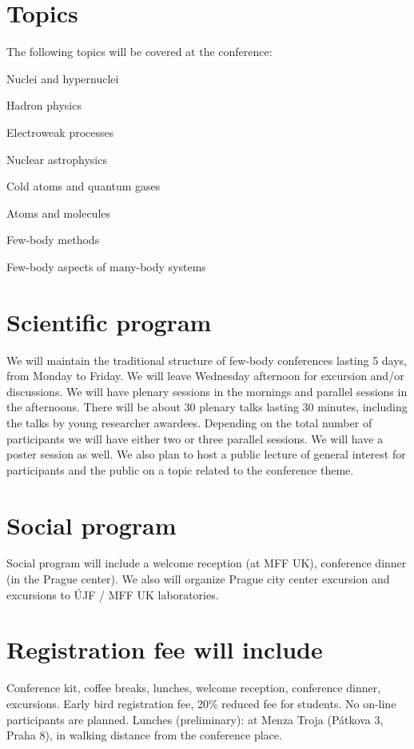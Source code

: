 \documentclass[12pt]{extarticle}
\newcommand*\sq{\mathbin{\vcenter{\hbox{\rule{.8ex}{.8ex}}}}}
\newenvironment{t_sq_itemize}
{\begin{itemize}[topsep=0pt, parsep=0pt, itemsep=0pt, leftmargin=*]
    \renewcommand{\labelitemi}{{\(\sq\)}}}
  {\end{itemize}}
\begin{document}
\section*{Topics}
\noindent
The following topics will be covered at the conference:
\begin{t_sq_itemize}
\item Nuclei and hypernuclei
\item Hadron physics
\item Electroweak processes
\item Nuclear astrophysics
\item Cold atoms and quantum gases
\item Atoms and molecules
\item Few-body methods
\item Few-body aspects of many-body systems
\end{t_sq_itemize}

\section*{Scientific program}
\noindent
We will maintain the traditional structure of few-body conferences lasting 5 days, from Monday
to Friday. We will leave Wednesday afternoon for excursion and/or discussions. We will have plenary sessions
in the mornings and parallel sessions in the afternoons. There will be about 30 plenary talks lasting
30 minutes, including the talks by young researcher awardees. Depending on the total number of
participants we will have either two or three parallel sessions. We will have a poster session as well.
We also plan to host a public lecture of general interest for participants and the public on a topic related
to the conference theme. 

\section*{Social program}
\noindent
Social program will include a welcome reception (at MFF UK), conference dinner (in the Prague center). 
We also will organize Prague city center excursion and excursions to ÚJF / MFF UK laboratories.

\section*{Registration fee will include}
\noindent
Conference kit, coffee breaks, lunches, welcome reception, conference dinner, excursions. Early bird registration fee, 20\%
reduced fee for students. No on-line participants are planned.
Lunches (preliminary): at Menza Troja (Pátkova 3, Praha 8), in walking distance from the conference place.
\end{document}
